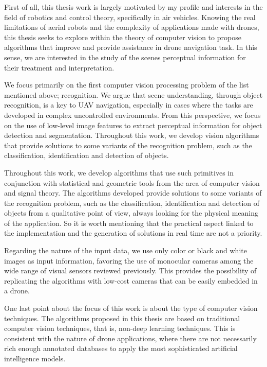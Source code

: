 First of all, this thesis work is largely motivated by my profile and interests in the field of robotics and control theory, specifically in air vehicles. Knowing the real limitations of aerial robots and the complexity of applications made with drones, this thesis seeks to explore within the theory of computer vision to propose algorithms that improve and provide assistance in drone navigation task. In this sense, we are interested in the study of the scenes perceptual information for their treatment and interpretation.  

We focus primarily on the first computer vision processing problem of the list mentioned above; recognition. We argue that scene understanding, through object recognition, is a key to UAV navigation, especially in cases where the tasks are developed in complex uncontrolled environments. From this perspective, we focus on the use of low-level image features to extract perceptual information for object detection and segmentation. Throughout this work, we develop vision algorithms that provide solutions to some variants of the recognition problem, such as the classification, identification and detection of objects. 


Throughout this work, we develop algorithms that use such primitives in conjunction with statistical and geometric tools from the area of computer vision and signal theory. The algorithms developed provide solutions to some variants of the recognition problem, such as the classification, identification and detection of objects from a qualitative point of view, always looking for the physical meaning of the application. So it is worth mentioning that the practical aspect linked to the implementation and the generation of solutions in real time are not a priority.

Regarding the nature of the input data, we use only color or black and white images as input information, favoring the use of monocular cameras among the wide range of visual sensors reviewed previously. This provides the possibility of replicating the algorithms with low-cost cameras that can be easily embedded in a drone.

One last point about the focus of this work is about the type of computer vision techniques. The algorithms proposed in this thesis are based on traditional computer vision techniques, that is, non-deep learning techniques. This is consistent with the nature of drone applications, where there are not necessarily rich enough annotated databases to apply the most sophisticated artificial intelligence models.

